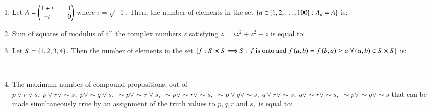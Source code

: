 \documentclass[journal]{IEEEtran}
\theoremstyle{remark}
\begin{document}
\begin{enumerate}
\hfill{}
\\

\item  Let $A = \begin{pmatrix}1+\iota && 1\\-\iota &&0\end{pmatrix} $ where $\iota=\sqrt{-1}.$ Then, the number of elements in the set $ \left\{n \in \{1, 2, \ldots, 100\} : A_n = A\right\} $  is:\hfill{}\\

\item Sum of squares of modulus of all the complex numbers $z$ satisfying ${z} = \iota z^2 + z^2 - z$ is equal to:\hfill{}
\\

\item Let $S = \left\{1, 2, 3, 4\right\}.$ Then the number of elements in the set $\left\{f : S \times S \Longrightarrow S : f \text{ is onto and }f\left(a,b\right)=f\left(b,a\right) \geq a \; \forall \left(a,b\right) \in  S \times S\right\}$ is:

\hfill{}
\\

\item  The maximum number of compound propositions, out of $p \lor r \lor s, \; p \lor r \lor \sim s, \; p \lor \sim q \lor s, \; \sim p \lor \sim r \lor s, \; \sim p \lor \sim r \lor \sim s, \; \sim p \lor q \lor \sim s, \; q \lor r \lor \sim s, \; q \lor \sim r \lor \sim s, \; \sim p \lor \sim q \lor \sim s$ that can be made simultaneously true by an assignment of the truth values to $p, q, r \text{ and } s,$ is equal to:\hfill{}



\end{enumerate}
\end{document}
